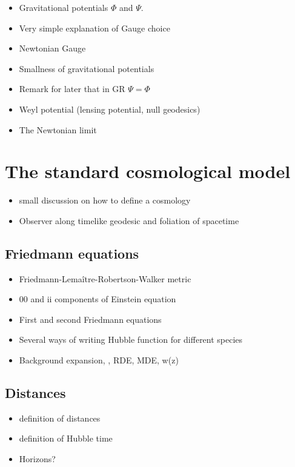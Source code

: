 \begin{itemize}
\item Gravitational potentials $\Phi$ and $\Psi$.
\item Very simple explanation of Gauge choice 
\item Newtonian Gauge
\item Smallness of gravitational potentials 
\item Remark for later that in GR $\Psi=\Phi$
\item Weyl potential (lensing potential, null geodesics)
\item{The Newtonian limit} 
\end{itemize}


\section{The standard cosmological model \label{sec:Standard-LCDM}}

\begin{itemize}
\item small discussion on how to define a cosmology
\item Observer along timelike geodesic and foliation of spacetime
\end{itemize}

\subsection{Friedmann equations}
 \begin{itemize}
 \item Friedmann-Lemaître-Robertson-Walker metric
 \item 00 and ii components of Einstein equation
 \item First and second Friedmann equations
 \item Several ways of writing Hubble function for different species
 \item Background expansion, , RDE, MDE, w(z)
 \end{itemize}

\subsection{Distances}
\begin{itemize}
\item definition of distances
\item definition of Hubble time 
\item Horizons?
\end{itemize}


